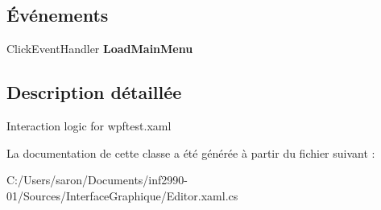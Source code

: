 \subsection*{Événements}
\begin{DoxyCompactItemize}
\item 
\hypertarget{class_interface_graphique_1_1_editor_a361c2e1a5c98707a168204aab184c23e}{Click\-Event\-Handler {\bfseries Load\-Main\-Menu}}\label{class_interface_graphique_1_1_editor_a361c2e1a5c98707a168204aab184c23e}

\end{DoxyCompactItemize}


\subsection{Description détaillée}
Interaction logic for wpftest.\-xaml 



La documentation de cette classe a été générée à partir du fichier suivant \-:\begin{DoxyCompactItemize}
\item 
C\-:/\-Users/saron/\-Documents/inf2990-\/01/\-Sources/\-Interface\-Graphique/Editor.\-xaml.\-cs\end{DoxyCompactItemize}
